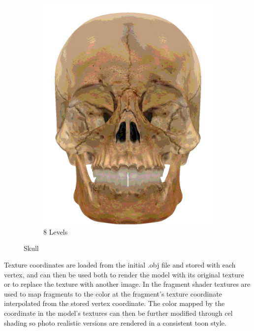 \begin{figure}
\begin{subfigure}[b]{0.15\textwidth}
        \includegraphics[width=\textwidth]{img/textures/CelShadeTexture8Skull.png}
        \caption{8 Levels}
        \label{fig:CelShadeTexture8Skull}
    \end{subfigure}
\caption{Skull}
\end{figure}

Texture coordinates are loaded from the initial .obj file and stored with each vertex, and can then be used both to render the model with its original texture or to replace the texture with another image. In the fragment shader textures are used to map fragments to the color at the fragment's texture coordinate interpolated from the stored vertex coordinate. The color mapped by the coordinate in the model's textures can then be further modified through cel shading so photo realistic versions are rendered in a consistent toon style.

